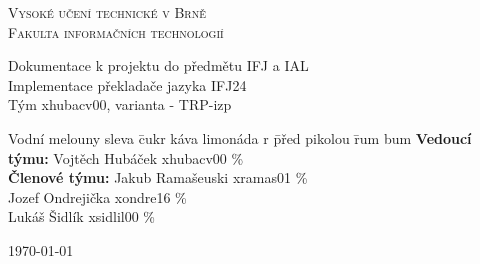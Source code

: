 \documentclass[a4paper, 11pt]{article}
\begin{document}
\begin{titlepage}
    \begin{center}
        \Huge{\textsc{Vysoké učení technické v Brně}} \\
        \huge{\textsc{Fakulta informačních technologií}} \\
        \begin{figure}[h]
            \centering
        \end{figure}
        \LARGE{Dokumentace k projektu do předmětu IFJ a IAL} \\[0,05em]
        \Huge{Implementace překladače jazyka IFJ24}\\[0,2em]
        \Large{Tým xhubacv00, varianta - TRP-izp}
    \end{center}

    \hfill
    \begin{minipage}{\textwidth}
        \large
        \begin{tabbing}
            Vodní melouny sleva \= cukr káva limonáda r  \= před pikolou  \= rum bum \kill
            \textbf{Vedoucí týmu:} \> Vojtěch Hubáček \> xhubacv00 \% \\
            \textbf{Členové týmu:}  \> Jakub Ramašeuski \> xramas01 \% \\
            \> Jozef Ondrejička \> xondre16 \% \\
            \> Lukáš Šidlík \> xsidlil00 \% \\
        \end{tabbing} 
    \end{minipage}
        
    \begin{minipage}{0.5 \textwidth}
        \large
        \today
    \end{minipage}
\end{titlepage}

\begin{titlepage}
    \tableofcontents
\end{titlepage}
\setcounter{page}{1}

\end{document}
